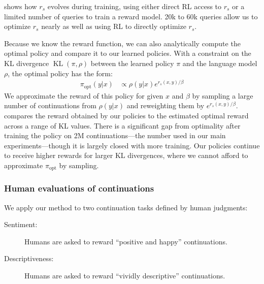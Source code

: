 \documentclass{article}
\newcommand{\KL}{\operatorname{KL}}
\begin{document}
 shows how $r_s$
evolves during training, using either direct RL access to $r_s$ or a limited number of queries to train a reward model.
20k to 60k queries allow us to optimize
$r_s$ nearly as well as using RL to directly optimize $r_s$.

Because we know the reward function,
we can also analytically compute the optimal policy
and compare it to our learned policies.
\newcommand{\popt}[2]{\pi_{\textrm{opt}}(#1 #2)}
With a constraint on the KL divergence $\KL(\pi, \rho)$ between the learned policy $\pi$
and the language model $\rho$,
the optimal policy has the form:
\begin{align*}
\pi_\textrm{opt}(y | x) &\propto \rho(y | x) e^{r_s(x,y) / \beta }
\end{align*}
We approximate the reward of this policy for given $x$ and $\beta$
by sampling a large number of continuations from $\rho(y|x)$ and reweighting them by $e^{r_s(x,y) / \beta}$.
 compares the reward obtained by our policies
to the estimated optimal reward across a range of KL values.
There is a significant gap from optimality after training the policy
on 2M continuations---the number used in our main experiments---though it is largely closed with more training.
Our policies continue to receive higher rewards for larger KL divergences,
where we cannot afford to approximate $\pi_\textrm{opt}$ by sampling.

\subsubsection{Human evaluations of continuations\label{sec:style}}


We apply our method to two continuation tasks defined by human judgments:
\begin{description}
\item[Sentiment:] Humans are asked to reward ``positive and happy'' continuations.
\item[Descriptiveness:] Humans are asked to reward ``vividly descriptive'' continuations.
\end{description}
\end{document}
